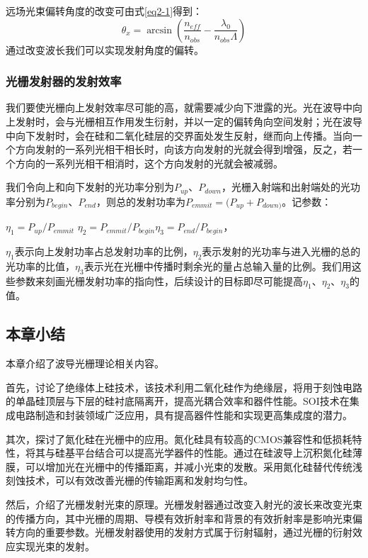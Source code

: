 \documentclass[UTF8,a4paper,12pt]{ctexart}
\numberwithin{equation}{section}
\begin{document}
远场光束偏转角度的改变可由式\ref{eq2-1}得到：
\begin{equation}
    \theta_x=\arcsin{\left(\frac{n_{eff}}{n_{obs}}-\frac{\lambda_0}{n_{obs}\Lambda}\right)}
    \label{eq2-17}
\end{equation}
通过改变波长我们可以实现发射角度的偏转。
\subsubsection{光栅发射器的发射效率}
我们要使光栅向上发射效率尽可能的高，就需要减少向下泄露的光。光在波导中向上发射时，会与光栅相互作用发生衍射，并以一定的偏转角向空间发射；光在波导中向下发射时，会在硅和二氧化硅层的交界面处发生反射，继而向上传播。当向一个方向发射的一系列光相干相长时，向该方向发射的光就会得到增强，反之，若一个方向的一系列光相干相消时，这个方向发射的光就会被减弱。

我们令向上和向下发射的光功率分别为$P_{up}$、$P_{down}$，光栅入射端和出射端处的光功率分别为$P_{begin}$、$P_{end}$，则总的发射功率为$P_{emmit}=(P_{up}+P_{down)}$。记参数：
\begin{center}
    $\eta_1 = P_{up}/P_{emmit}$ \qquad $\eta_2=P_{emmit}/P_{begin}$\qquad$\eta_3=P_{end}/P_{begin}$，
\end{center}
$\eta_1$表示向上发射功率占总发射功率的比例，$\eta_2$表示发射的光功率与进入光栅的总的光功率的比值，$\eta_3$表示光在光栅中传播时剩余光的量占总输入量的比例。我们用这些参数来刻画光栅发射功率的指向性，后续设计的目标即尽可能提高$\eta_1$、$\eta_2$、$\eta_3$的值。

\subsection{本章小结}

本章介绍了波导光栅理论相关内容。

首先，讨论了绝缘体上硅技术，该技术利用二氧化硅作为绝缘层，将用于刻蚀电路的单晶硅顶层与下层的硅衬底隔离开，提高光耦合效率和器件性能。SOI技术在集成电路制造和封装领域广泛应用，具有提高器件性能和实现更高集成度的潜力。


其次，探讨了氮化硅在光栅中的应用。氮化硅具有较高的CMOS兼容性和低损耗特性，将其与硅基平台结合可以提高光学器件的性能。通过在硅波导上沉积氮化硅薄膜，可以增加光在光栅中的传播距离，并减小光束的发散。采用氮化硅替代传统浅刻蚀技术，可以有效改善光栅的传输距离和发射均匀性。

然后，介绍了光栅发射光束的原理。光栅发射器通过改变入射光的波长来改变光束的传播方向，其中光栅的周期、导模有效折射率和背景的有效折射率是影响光束偏转方向的重要参数。光栅发射器使用的发射方式属于衍射辐射，通过光栅的衍射效应实现光束的发射。
\end{document}
